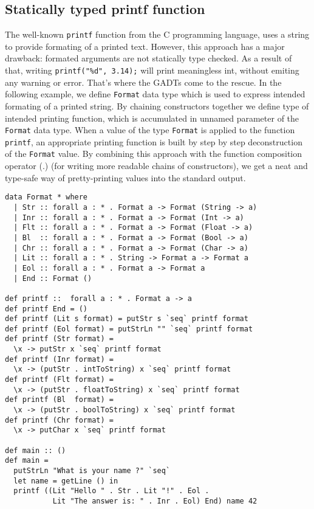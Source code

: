 \documentclass[declaration,shortabstract,english]{iithesis}
\begin{document}
\subsection*{Statically typed printf function\cite{inproceedings}}
The well-known \verb+printf+ function from the C programming language,
uses a string to provide formating of a printed text. However, this approach
has a major drawback: formated arguments are not statically type checked.
As a result of that, writing \verb+printf("%d", 3.14);+ will print meaningless int,
without emiting any warning or error. That's where the GADTs come to the rescue. In the following
example, we define \verb+Format+ data type which is used to express intended formating of a
printed string. By chaining constructors together we define type of intended printing function,
which is accumulated in unnamed parameter of the \verb+Format+ data type. When a value of
the type \verb+Format+ is applied to the function \verb+printf+, an appropriate printing function
is built by step by step deconstruction of the \verb+Format+ value. By combining this approach
with the function composition operator (.) (for writing more readable chains of constructors),
we get a neat and type-safe way of pretty-printing values into the standard output.
\begin{verbatim}
data Format * where
  | Str :: forall a : * . Format a -> Format (String -> a)
  | Inr :: forall a : * . Format a -> Format (Int -> a)
  | Flt :: forall a : * . Format a -> Format (Float -> a)
  | Bl  :: forall a : * . Format a -> Format (Bool -> a)
  | Chr :: forall a : * . Format a -> Format (Char -> a)
  | Lit :: forall a : * . String -> Format a -> Format a
  | Eol :: forall a : * . Format a -> Format a
  | End :: Format ()

def printf ::  forall a : * . Format a -> a
def printf End = ()
def printf (Lit s format) = putStr s `seq` printf format
def printf (Eol format) = putStrLn "" `seq` printf format
def printf (Str format) =
  \x -> putStr x `seq` printf format
def printf (Inr format) =
  \x -> (putStr . intToString) x `seq` printf format
def printf (Flt format) =
  \x -> (putStr . floatToString) x `seq` printf format
def printf (Bl  format) =
  \x -> (putStr . boolToString) x `seq` printf format
def printf (Chr format) =
  \x -> putChar x `seq` printf format

def main :: ()
def main =
  putStrLn "What is your name ?" `seq`
  let name = getLine () in
  printf ((Lit "Hello " . Str . Lit "!" . Eol .
           Lit "The answer is: " . Inr . Eol) End) name 42
\end{verbatim}
\end{document}
